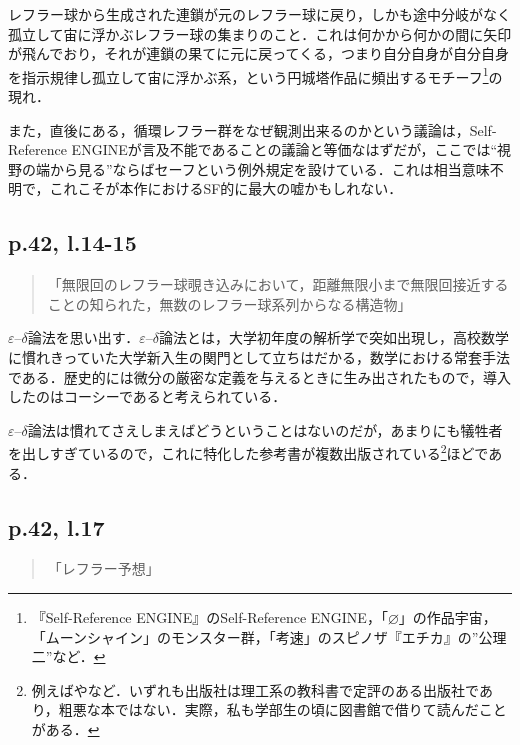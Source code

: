 \documentclass[10pt, a5paper, twoside]{jsarticle}
\theoremstyle{definition}
\begin{document}
                レフラー球から生成された連鎖が元のレフラー球に戻り，しかも途中分岐がなく孤立して宙に浮かぶレフラー球の集まりのこと．これは何かから何かの間に矢印が飛んでおり，それが連鎖の果てに元に戻ってくる，つまり自分自身が自分自身を指示規律し孤立して宙に浮かぶ系，という円城塔作品に頻出するモチーフ\footnote{『Self-Reference ENGINE』のSelf-Reference ENGINE，「$\varnothing$」の作品宇宙，「ムーンシャイン」のモンスター群，「考速」のスピノザ『エチカ』の”公理二”など．}の現れ．

                また，直後にある，循環レフラー群をなぜ観測出来るのかという議論は，Self-Reference ENGINEが言及不能であることの議論と等価なはずだが，ここでは“視野の端から見る”ならばセーフという例外規定を設けている．これは相当意味不明で，これこそが本作におけるSF的に最大の嘘かもしれない．

            \subsection{p.42, l.14-15}

                \begin{quote}

                    「無限回のレフラー球覗き込みにおいて，距離無限小まで無限回接近することの知られた，無数のレフラー球系列からなる構造物」

                \end{quote}

                $\varepsilon$--$\delta$論法を思い出す．$\varepsilon$--$\delta$論法とは，大学初年度の解析学で突如出現し，高校数学に慣れきっていた大学新入生の関門として立ちはだかる，数学における常套手法である．歴史的には微分の厳密な定義を与えるときに生み出されたもので，導入したのはコーシーであると考えられている．

                $\varepsilon$--$\delta$論法は慣れてさえしまえばどうということはないのだが，あまりにも犠牲者を出しすぎているので，これに特化した参考書が複数出版されている\footnote{例えば\cite{mtn}や\cite{hsi}など．いずれも出版社は理工系の教科書で定評のある出版社であり，粗悪な本ではない．実際，私も学部生の頃に図書館で借りて読んだことがある．}ほどである．

            \subsection{p.42, l.17}

                \begin{quote}

                    「レフラー予想」

                \end{quote}
\end{document}
